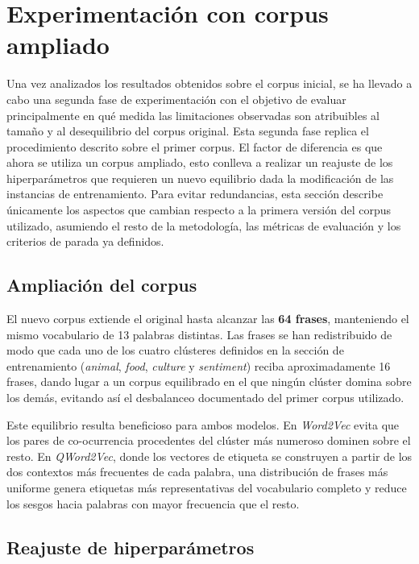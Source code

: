\section{Experimentación con corpus ampliado}
\label{sec:experimentacion-v2}

Una vez analizados los resultados obtenidos sobre el corpus inicial, se ha llevado a cabo una segunda fase de experimentación con el objetivo de evaluar principalmente en qué medida las limitaciones observadas son atribuibles al tamaño y al desequilibrio del corpus original. Esta segunda fase replica el procedimiento descrito sobre el primer corpus. El factor de diferencia es que ahora se utiliza un corpus ampliado, esto conlleva a realizar un reajuste de los hiperparámetros que requieren un nuevo equilibrio dada la modificación de las instancias de entrenamiento. Para evitar redundancias, esta sección describe únicamente los aspectos que cambian respecto a la primera versión del corpus utilizado, asumiendo el resto de la metodología, las métricas de evaluación y los criterios de parada ya definidos.

\subsection{Ampliación del corpus}

El nuevo corpus extiende el original hasta alcanzar las \textbf{64 frases}, manteniendo el mismo vocabulario de 13 palabras distintas. Las frases se han redistribuido de modo que cada uno de los cuatro clústeres definidos en la sección de entrenamiento (\textit{animal}, \textit{food}, \textit{culture} y \textit{sentiment}) reciba aproximadamente 16 frases, dando lugar a un corpus equilibrado en el que ningún clúster domina sobre los demás, evitando así el desbalanceo documentado del primer corpus utilizado.

Este equilibrio resulta beneficioso para ambos modelos. En \textit{Word2Vec} evita que los pares de co-ocurrencia procedentes del clúster más numeroso dominen sobre el resto. En \textit{QWord2Vec}, donde los vectores de etiqueta se construyen a partir de los dos contextos más frecuentes de cada palabra, una distribución de frases más uniforme genera etiquetas más representativas del vocabulario completo y reduce los sesgos hacia palabras con mayor frecuencia que el resto.

\subsection{Reajuste de hiperparámetros}

